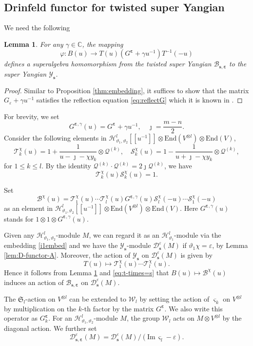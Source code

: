 \documentclass[11pt,reqno]{amsart}
\numberwithin{equation}{section}
\newtheorem{lem}[thm]{Lemma}
\theoremstyle{definition}
\theoremstyle{remark}
\newcommand{\beq}{\begin{equation}}
\newcommand{\eeq}{\end{equation}}
\newcommand{\C}{\mathbb{C}}
\newcommand{\mc}{\mathcal}
\newcommand{\fkS}{\mathfrak{S}}
\newcommand{\End}{\mathrm{End}}
\newcommand{\scrW}{\mathscr{W}}
\newcommand{\lle}{\leqslant}
\newcommand{\YMN}{{\mathscr{Y}_{\bm s}}}
\newcommand{\BMN}{{\mathscr{B}_{\bm s,\bm \ve}}}
\newcommand{\ve}{\varepsilon}
\newcommand{\s}{{\bm s}}
\begin{document}
\subsection{Drinfeld functor for twisted super Yangian}
We need the following
\begin{lem}\label{lem:embedding}
For any $\gamma\in\C$, the mapping
\beq\label{eq:emd-b-new}
\varphi: B(u)\to T(u) (G^{\bm\ve}+\gamma u^{-1})T^{-1}(-u)
\eeq
defines a superalgebra homomorphism from the twisted super Yangian $\mathscr B_{\bm s,\bm\ve}$ to the super Yangian $\YMN$.
\end{lem}
\begin{proof}
Similar to Proposition \ref{thm:embedding}, it suffices to show that the matrix $G_{\ve}+\gamma u^{-1}$ satisfies the reflection equation \eqref{eq:reflectG} which it is known in \cite{Arnaudon2004general,Ragoucy2007analytical,Belliard2009nested}.
\end{proof}

For brevity, we set
$$
G^{\bm\ve,\gamma}(u)=G^{\bm\ve}+\gamma u^{-1},\quad \jmath=\frac{m-n}{2}.
$$
Consider the following elements in $\mathscr H^l_{\vartheta_1,\vartheta_2}[[u^{-1}]]\otimes \End(V^{\otimes l})\otimes \End(V)$,
\[
\mc T^{\chi}_k(u)=1+\frac{1}{u-\jmath-\chi y_k}\otimes \mc Q^{(k)},\quad \mc S^{\chi}_k(u)=1-\frac{1}{u+\jmath-\chi y_k}\otimes \mc Q^{(k)},
\]
for $1\lle k\lle l$. By the identity $\mc Q^{(k)}\cdot \mc Q^{(k)} = 2\jmath \mc Q^{(k)}$, we have
\beq\label{eq:t-times=s}
\mc T^{\chi}_k(u)\mc S^{\chi}_k(u)=1.
\eeq

Set
\beq\label{eq:B-chi}
\mc B^\chi(u)=\mc T_1^\chi(u)\cdots \mc T^{\chi}_l(u)G^{\bm\ve,\gamma}(u)\mc S_l^\chi(-u)\cdots \mc S^{\chi}_1(-u)
\eeq
as an element in $\mathscr H_{\vartheta_1,\vartheta_2}^l[[u^{-1}]]\otimes \End(V^{\otimes l})\otimes \End(V)$. Here $G^{\bm\ve,\gamma}(u)$ stands for $1\otimes 1\otimes G^{\bm\ve,\gamma}(u)$.

Given any $\mathscr H_{\vartheta_1,\vartheta_2}^l$-module $M$, we can regard it as an $\mathscr H_{\vartheta_1}^l$-module via the embedding \eqref{i1embed} and we have the $\YMN$-module $\mc D_\s^{\ve}(M)$ if $\vartheta_1\chi =\ve$, by Lemma \ref{lem:D-functor-A}. Moreover,  the action of $\YMN$ on $\mc D_\s^{\ve}(M)$ is given by
$$
T(u)\mapsto \mc T_1^\chi(u)\cdots \mc T^{\chi}_l(u).
$$
Hence it follows from Lemma \ref{lem:embedding} and \eqref{eq:t-times=s} that $B(u)\mapsto \mc B^\chi(u)$ induces an action of $\BMN$ on $\mc D^{\ve}_\s(M)$.

The $\fkS_l$-action on $V^{\otimes l}$ can be extended to $\scrW_l$ by setting the action of $\varsigma_k$ on $V^{\otimes l}$ by multiplication on the $k$-th factor by the matrix $G^{\bm \ve}$. We also write this operator as $G^{\bm\ve}_k$. For an $\mathscr H_{\vartheta_1,\vartheta_2}^l$-module $M$, the group $\scrW_l$ acts on $M\otimes V^{\otimes l}$ by the diagonal action. We further set
\[
\mc D_{\s,\bm\ve}^{\ve}(M)=\mc D_{\s}^\ve(M)/(\mathrm{Im}\,\varsigma_l-\ve).
\]
\end{document}
